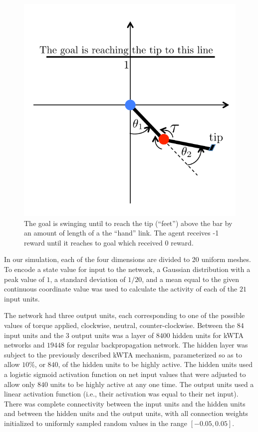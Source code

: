 \documentclass[preprint,12pt,authoryear]{elsarticle}
\begin{document}
\begin{figure}
\begin{center}
\includegraphics[scale=0.5]{figures/acrobot-schematic.pdf}
\end{center}
\vspace{-4mm}
\caption{The goal is swinging until to reach the tip (``feet'') above the bar by an amount of length of a the ``hand'' link. The agent receives -1 reward until it reaches to goal which received 0 reward.}
\label{fig:acrobot}
\end{figure}

 In our simulation, each of the four dimensions are divided to 20 uniform meshes. To encode a state value for input to the
network, a Gaussian distribution with a peak value of $1$, a standard
deviation of $1/20$, and a mean equal to the given continuous
coordinate value was used to calculate the activity of each of
the $21$ input units.

The network had three output units, each corresponding to one of the possible values of torque applied, clockwise, neutral, counter-clockwise. Between the $84$ input units and the $3$ output units was a layer of $8400$ hidden units for kWTA networks and $19448$ for regular backpropagation network. The hidden layer was
subject to the previously described kWTA mechanism, parameterized so
as to allow $10\%$, or $840$, of the hidden units to be highly active.
The hidden units used a logistic sigmoid activation function on net
input values that were adjusted to allow only $840$ units to be highly
active at any one time. The output units used a linear activation
function (i.e., their activation was equal to their net input). There
was complete connectivity between the input units and the hidden units
and between the hidden units and the output units, with all connection
weights initialized to uniformly sampled random values in the range
$[-0.05,0.05]$.
\end{document}
